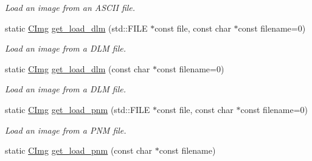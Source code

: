 \begin{DoxyCompactItemize}
\begin{DoxyCompactList}\small\item\em Load an image from an ASCII file. \item\end{DoxyCompactList}\item 
\hypertarget{structcimg__library_1_1_c_img_acc2f61d36e9df6729f7997859ea9a827}{
static \hyperlink{structcimg__library_1_1_c_img}{CImg} \hyperlink{structcimg__library_1_1_c_img_acc2f61d36e9df6729f7997859ea9a827}{get\_\-load\_\-dlm} (std::FILE $\ast$const file, const char $\ast$const filename=0)}
\label{structcimg__library_1_1_c_img_acc2f61d36e9df6729f7997859ea9a827}

\begin{DoxyCompactList}\small\item\em Load an image from a DLM file. \item\end{DoxyCompactList}\item 
\hypertarget{structcimg__library_1_1_c_img_a579977ab231e3d80de8348efaa5940be}{
static \hyperlink{structcimg__library_1_1_c_img}{CImg} \hyperlink{structcimg__library_1_1_c_img_a579977ab231e3d80de8348efaa5940be}{get\_\-load\_\-dlm} (const char $\ast$const filename=0)}
\label{structcimg__library_1_1_c_img_a579977ab231e3d80de8348efaa5940be}

\begin{DoxyCompactList}\small\item\em Load an image from a DLM file. \item\end{DoxyCompactList}\item 
\hypertarget{structcimg__library_1_1_c_img_ae510f9147c4980f4e2eefccba8b2d4c3}{
static \hyperlink{structcimg__library_1_1_c_img}{CImg} \hyperlink{structcimg__library_1_1_c_img_ae510f9147c4980f4e2eefccba8b2d4c3}{get\_\-load\_\-pnm} (std::FILE $\ast$const file, const char $\ast$const filename=0)}
\label{structcimg__library_1_1_c_img_ae510f9147c4980f4e2eefccba8b2d4c3}

\begin{DoxyCompactList}\small\item\em Load an image from a PNM file. \item\end{DoxyCompactList}\item 
\hypertarget{structcimg__library_1_1_c_img_ab13c7148c1089c070b2f8860d3a485ee}{
static \hyperlink{structcimg__library_1_1_c_img}{CImg} \hyperlink{structcimg__library_1_1_c_img_ab13c7148c1089c070b2f8860d3a485ee}{get\_\-load\_\-pnm} (const char $\ast$const filename)}
\label{structcimg__library_1_1_c_img_ab13c7148c1089c070b2f8860d3a485ee}


\end{DoxyCompactItemize}
